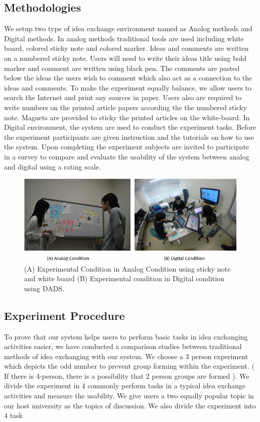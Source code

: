 \documentclass{sigchi}
\begin{document}
\begin{itemize}
\begin{itemize}
\subsection{Methodologies}

We setup two type of idea exchange environment named as Analog methods and Digital methods. In analog methods traditional tools are used including white board, colored sticky note and colored marker. Ideas and comments are written on a numbered  sticky note. Users will need to write their ideas title using bold marker and comment are written using black pen. The comments  are pasted below the ideas the users wish to comment which also act as a connection to the ideas and comments. To make the experiment equally balance, we allow users to search the Internet and print any sources in paper. Users also are required to write numbers on the printed article papers according the the numbered sticky note. Magnets are provided to sticky the printed articles on the white-board. In Digital environment, the system are used to conduct the experiment tasks. Before the experiment participants are given instruction and the tutorials on how to use the system. Upon completing the experiment subjects are invited to participate in a survey to compare and evaluate the usability of the system between analog and digital using a rating scale.

\begin{figure}[!h]
\centering
\includegraphics[width=1.0\columnwidth]{condition}
\caption{(A) Experimental Condition in Analog Condition using sticky note and white board (B) Experimental condition in Digital condition using DADS.}
\label{fig:figure1}
\end{figure}


\subsection{Experiment Procedure}

To prove that our system helps users to perform basic tasks in idea exchanging activities easier, we have conducted a comparison studies between traditional methods of idea exchanging  with our system. We choose a 3 person experiment which depicts the odd number to prevent group forming within the experiment. ( If there is 4-person, there is a possibility that 2 person groups are formed ). We divide the experiment in 4 commonly perform tasks in a typical idea exchange activities and measure the usability.  We give users a two equally popular topic in our host university as the topics of discussion. We also divide the experiment into 4 task


\end{itemize}
\end{itemize}
\end{document}
